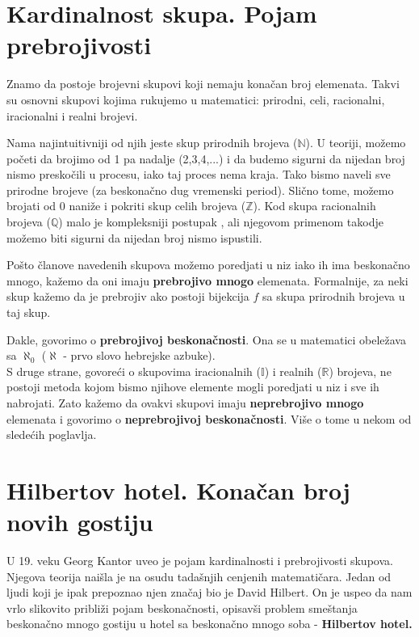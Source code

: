 \documentclass[a4paper]{article}
\begin{document}
\section{Kardinalnost skupa. Pojam prebrojivosti}
\label{poglavlje:Kardinalnost. Pojam prebrojivosti}

Znamo da postoje brojevni skupovi koji nemaju konačan broj elemenata. Takvi su osnovni skupovi kojima rukujemo u matematici: prirodni, celi, racionalni, iracionalni i realni brojevi.

Nama najintuitivniji od njih jeste skup prirodnih brojeva ($\mathbb{N}$). U teoriji, možemo početi da brojimo od 1 pa nadalje (2,3,4,...) i da budemo sigurni da nijedan broj nismo preskočili u procesu, iako taj proces nema kraja. Tako bismo naveli sve prirodne brojeve (za beskonačno dug vremenski period). Slično tome, možemo brojati od 0 naniže i pokriti skup celih brojeva ($\mathbb{Z}$). Kod skupa racionalnih brojeva ($\mathbb{Q}$) malo je kompleksniji postupak \cite{Kantorov dijagonalni postupak}, ali njegovom primenom takodje možemo biti sigurni da nijedan broj nismo ispustili.

Pošto članove navedenih skupova možemo poredjati u niz iako ih ima beskonačno mnogo, kažemo da oni imaju \textbf{prebrojivo mnogo} elemenata. Formalnije, za neki skup kažemo da je prebrojiv ako postoji bijekcija $f$ sa skupa prirodnih brojeva u taj skup\cite{klaric2016}.

Dakle, govorimo o \textbf{prebrojivoj beskonačnosti}. Ona se u matematici obeležava sa $\aleph_{0}$ ($\aleph$ - prvo slovo hebrejske azbuke).\\

S druge strane, govoreći o skupovima iracionalnih ($\mathbb{I}$) i realnih ($\mathbb{R}$) brojeva, ne postoji metoda kojom bismo njihove elemente mogli poredjati u niz i sve ih nabrojati. Zato kažemo da ovakvi skupovi imaju \textbf{neprebrojivo mnogo} elemenata i govorimo o \textbf{neprebrojivoj beskonačnosti}. Više o tome u nekom od sledećih poglavlja.


\newpage

\section{Hilbertov hotel. Konačan broj novih gostiju}
\label{poglavlje:Hilbertov hotel. Konačan broj novih gostiju}
U 19. veku Georg Kantor uveo je pojam kardinalnosti i prebrojivosti skupova. Njegova teorija naišla je na osudu tadašnjih cenjenih matematičara.
Jedan od ljudi koji je ipak prepoznao njen značaj bio je David Hilbert\cite{David Hilbert}.
On je uspeo da nam vrlo slikovito približi pojam beskonačnosti, opisavši problem smeštanja beskonačno mnogo gostiju u hotel sa beskonačno mnogo soba - \textbf{Hilbertov hotel.}
\end{document}
